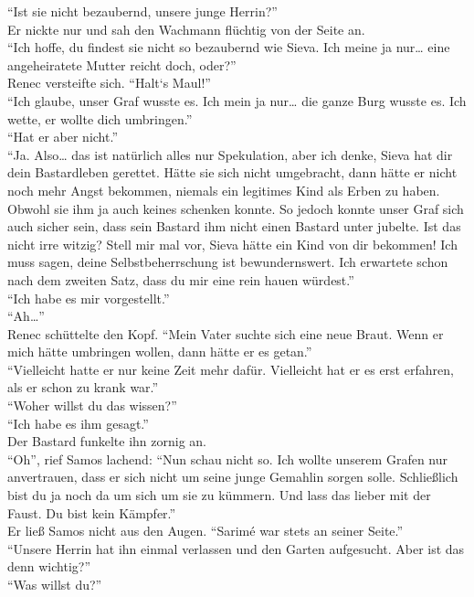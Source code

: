 ``Ist sie nicht bezaubernd, unsere junge Herrin?''\\
Er nickte nur und sah den Wachmann flüchtig von der Seite an.\\
``Ich hoffe, du findest sie nicht so bezaubernd wie Sieva. Ich meine ja nur… eine angeheiratete 
Mutter reicht doch, oder?''\\
Renec versteifte sich. ``Halt‘s Maul!''\\
``Ich glaube, unser Graf wusste es. Ich mein ja nur… die ganze Burg wusste es. Ich wette, er wollte 
dich umbringen.''\\
``Hat er aber nicht.''\\
``Ja. Also… das ist natürlich alles nur Spekulation, aber ich denke, Sieva hat dir dein 
Bastardleben gerettet. Hätte sie sich nicht umgebracht, dann hätte er nicht noch mehr Angst 
bekommen, niemals ein legitimes Kind als Erben zu haben. Obwohl sie ihm ja auch keines schenken 
konnte. So jedoch konnte unser Graf sich auch sicher sein, dass sein Bastard ihm nicht einen 
Bastard 
unter jubelte. Ist das nicht irre witzig? Stell mir mal vor, Sieva hätte ein Kind von dir bekommen! 
Ich muss sagen, deine Selbstbeherrschung ist bewundernswert. Ich erwartete schon nach dem zweiten 
Satz, dass du mir eine rein hauen würdest.''\\
``Ich habe es mir vorgestellt.''\\
``Ah…''\\
Renec schüttelte den Kopf. ``Mein Vater suchte sich eine neue Braut. Wenn er mich hätte umbringen 
wollen, dann hätte er es getan.''\\
``Vielleicht hatte er nur keine Zeit mehr dafür. Vielleicht hat er es erst erfahren, als er schon 
zu krank war.''\\
``Woher willst du das wissen?''\\
``Ich habe es ihm gesagt.''\\
Der Bastard funkelte ihn zornig an.\\
``Oh'', rief Samos lachend: ``Nun schau nicht so. Ich wollte unserem Grafen nur anvertrauen, dass 
er sich nicht um seine junge Gemahlin sorgen solle. Schließlich bist du ja noch da um sich um sie 
zu kümmern. Und lass das lieber mit der Faust. Du bist kein Kämpfer.''\\
Er ließ Samos nicht aus den Augen. ``Sarimé war stets an seiner Seite.''\\
``Unsere Herrin hat ihn einmal verlassen und den Garten aufgesucht. Aber ist das denn wichtig?''\\
``Was willst du?''\\

